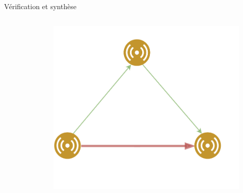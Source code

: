 \documentclass[compress]{beamer}
\theoremstyle{theorem}%
\begin{document}
\begin{frame}{Vérification et synthèse}
\begin{center}
\begin{columns}
\begin{column}{0.5\linewidth}
\begin{figure}
    \end{figure}
    \end{column}
    \begin{column}{0.5\linewidth}
    \begin{figure}
      \centering
      \includegraphics[width=0.7\linewidth]{resources/example3.pdf}
    \end{figure}
    \end{column}
  \end{columns}

  \end{center}
\end{frame}
\end{document}
